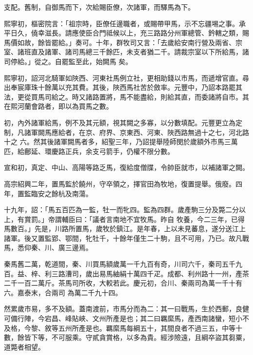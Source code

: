 \begin{pinyinscope}
 支配。舊制，自御馬而下，次給賜臣僚，次諸軍，而驛馬為下。



 熙寧初，樞密院言：「祖宗時，臣僚任邊職者，或賜帶甲馬，示不忘疆埸之事。承平日久，僥幸滋長。請應使臣合門祗候以上，充三路路分州軍總管、鈐轄之類，賜馬價如故，餘皆罷給。」奏可。十年，群牧司又言：「去歲給安南行營及兩省、宗室、諸班直及諸軍、諸司馬總三千餘匹，未支者猶二千。請裁宗室以下所給馬，諸司停給。」從之。自罷監至此，始闕馬
 矣。



 熙寧初，詔河北騎軍如陜西、河東社馬例立社，更相助錢以市馬，而遞增官直。尋出奉宸庫珠十餘萬以充其費。其後，陜西馬社苦於斂率。元豐中，乃詔本路罷其法，更從買馬司給之。時又諸路置將，馬不能盡給，則給其直，而委諸將自市。其在熙河蘭會路者，即以為買馬之數。



 初，內外諸軍給馬，例不及其元額，視其闕之多寡，以分數填配。元豐更立為定制，凡諸軍闕馬應給者，在京、府界、京東西、河東、陜西路無過十之七，河北路十之
 六。然其後諸軍闕馬者多，紹聖三年，乃詔提舉陸師閔於歲額外市馬三萬匹，給鄜延、環慶路正兵，余支弓箭手，仍權不限分數。



 宣和初，真定、中山、高陽等路乏馬，復給度僧牒，令帥臣就市，以補諸軍之闕。



 高宗紹興二年，置馬監於饒州，守卒領之，擇官田為牧地，復置提舉。俄廢。四年，置監臨安之餘杭及南蕩。



 十九年，詔：「馬五百匹為一監，牡一而牝四。監為四群。歲產駒三分及斃二分以上，有賞罰。」帝謂輔臣曰：「議者言南地不宜牧馬。昨自
 牧養，今二三年，已得馬數百。」先是，川路所置馬，歲牧於鎮江。是年春，上以未見蕃息，遂分送江上諸軍。後又置監郢、鄂間，牝牡千，十餘年僅生二十駒，且不可用，乃已。故凡戰馬，悉仰秦、川、廣三邊焉。



 秦馬舊二萬，乾道間，秦、川買馬額歲萬一千九百有奇，川司六千，秦司五千九百。益、梓、利三路漕司，歲出易馬紬絹十萬四千疋。成都、利州路十一州，產茶二千一百二萬斤。茶馬司所收，大較若此。慶元初，合川、秦兩司為萬一千十有六。嘉泰末，合兩司
 為萬二千九十四。



 然累歲市易，多不及額。蓋南渡前，市馬分而為二：其一曰戰馬，生於西郵，良健可備行陣，今宕昌、峰貼峽、文州所產是也；其二曰羈縻馬，產西南諸蠻，短小不及格，今黎、敘等五州所產是也。羈縻馬每綱五十，其間良者不過三五，中等十數，餘皆下等，不可服乘。守貳貪賞格，以多為貴。經涉險遠，且綱卒盜其芻粟，道斃者相望。




\end{pinyinscope}
